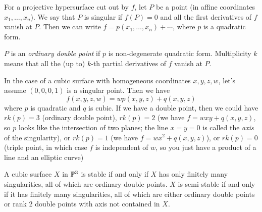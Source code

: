 For a projective hypersurface cut out by $f$, let $P$ be a point (in affine coordinates $x_1,\dots, x_n$). We say that $P$ is singular if $f(P)=0$ and all the first derivatives of $f$ vanish at $P$. Then we can write $f=p(x_1,\dots, x_n)+\cdots$, where $p$ is a quadratic form.
\begin{definition}
 $P$ is an \emph{ordinary double point} if $p$ is non-degenerate quadratic form. Multiplicity $k$ means that all the (up to) $k$-th partial derivatives of $f$ vanish at $P$.
\end{definition}
In the case of a cubic surface with homogeneous coordinates $x,y,z,w$, let's assume $(0,0,0,1)$ is a singular point. Then we have
\[
 f(x,y,z,w)=wp(x,y,z)+q(x,y,z)
\]
where $p$ is quadratic and $q$ is cubic. If we have a double point, then we could have $rk(p)=3$ (ordinary double point), $rk(p)=2$ (we have $f=wxy+q(x,y,z)$, so $p$ looks like the intersection of two planes; the line $x=y=0$ is called the \emph{axis} of the singularity), or $rk(p)=1$ (we have $f=wx^2+q(x,y,z)$), or $rk(p)=0$ (triple point, in which case $f$ is independent of $w$, so you just have a product of a line and an elliptic curve)
\begin{theorem}
 A cubic surface $X$ in $\mathbb{P}^3$ is stable if and only if $X$ has only finitely many singularities, all of which are ordinary double points. $X$ is semi-stable if and only if it has finitely many singularities, all of which are either ordinary double points or rank 2 double points with axis not contained in $X$.
\end{theorem}
